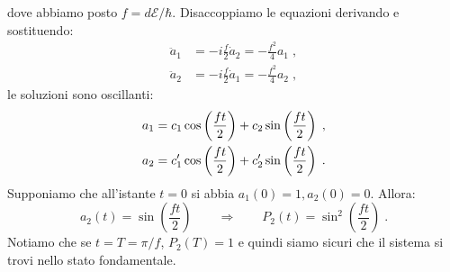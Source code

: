 \documentclass[10pt,a4paper]{report}
\theoremstyle{definition}
\numberwithin{equation}{section}
\begin{document}
dove abbiamo posto $f=d\mathcal{E}/\hbar$. Disaccoppiamo le equazioni derivando e sostituendo:
\begin{align*}
\ddot{a}_1 &= -i\frac{f}{2}\dot{a}_2=-\frac{f^2}{4}a_1\;, \\
\ddot{a}_2 &= -i\frac{f}{2}\dot{a}_1=-\frac{f^2}{4}a_2\;,
\end{align*}
le soluzioni sono oscillanti:
\begin{align}
a_1 &= c_1\cos\left(\frac{ft}{2}\right)+c_2\sin\left(\frac{ft}{2}\right)\;, \notag \\
a_2 &= c_1'\cos\left(\frac{ft}{2}\right)+c_2'\sin\left(\frac{ft}{2}\right)\;.
\end{align}
Supponiamo che all'istante $t=0$ si abbia $a_1(0)=1,a_2(0)=0$. Allora:
\begin{equation}
a_2(t)=\sin\left(\frac{ft}{2}\right)\qquad \Longrightarrow \qquad P_2(t)=\sin^2\left(\frac{ft}{2}\right)\;.
\end{equation}
Notiamo che se $t=T=\pi/f$, $P_2(T)=1$ e quindi siamo sicuri che il sistema si trovi nello stato fondamentale. \\
\end{document}
